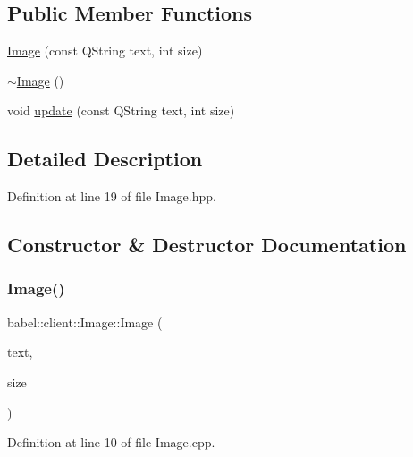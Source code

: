 \subsection*{Public Member Functions}
\begin{DoxyCompactItemize}
\item 
\mbox{\hyperlink{classbabel_1_1client_1_1_image_a842bdeaea0276c9e1f721ced3f01dfc5}{Image}} (const Q\+String text, int size)
\item 
\mbox{\hyperlink{classbabel_1_1client_1_1_image_a887868b77752a71a0f6108b01dea7243}{$\sim$\+Image}} ()
\item 
void \mbox{\hyperlink{classbabel_1_1client_1_1_image_a1d1329ab093dbd0383a60b96a7fcf862}{update}} (const Q\+String text, int size)
\end{DoxyCompactItemize}


\subsection{Detailed Description}


Definition at line 19 of file Image.\+hpp.



\subsection{Constructor \& Destructor Documentation}
\mbox{\label{classbabel_1_1client_1_1_image_a842bdeaea0276c9e1f721ced3f01dfc5}} 
\subsubsection{\texorpdfstring{Image()}{Image()}}
{\footnotesize\ttfamily babel\+::client\+::\+Image\+::\+Image (\begin{DoxyParamCaption}\item[{const Q\+String}]{text,  }\item[{int}]{size }\end{DoxyParamCaption})}



Definition at line 10 of file Image.\+cpp.

